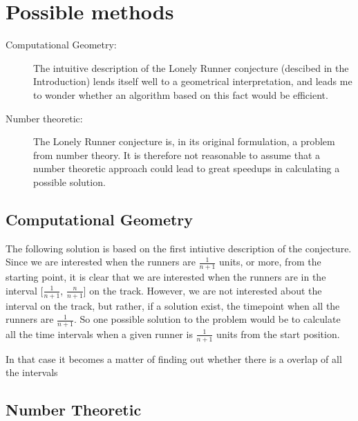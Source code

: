\section{Possible methods}
\label{choiceOfMethod}

\begin{description}
\item[Computational Geometry:] The intuitive description of the Lonely Runner conjecture (descibed in the Introduction) lends itself well to a geometrical interpretation, and leads me to wonder whether an algorithm based on this fact would be efficient.

\item[Number theoretic:] The Lonely Runner conjecture is, in its original formulation, a problem from number theory. It is therefore not reasonable to assume that a number theoretic approach could lead to great speedups in calculating a possible solution.
\end{description}

\subsection{Computational Geometry}
The following solution is based on the first intiutive description of the conjecture. Since we are interested when the runners are $\frac{1}{n + 1}$ units, or more, from the starting point, it is clear that we are interested when the runners are in the interval [$\frac{1}{n + 1}$, $\frac{n}{n + 1}$] on the track. However, we are not interested about the interval on the track, but rather, if a solution exist, the timepoint when all the runners are $\frac{1}{n+1}$. So one possible solution to the problem would be to calculate all the time intervals when a given runner is $\frac{1}{n+1}$ units from the start position. 

In that case it becomes a matter of finding out whether there is a overlap of all the intervals 

\subsection{Number Theoretic}

